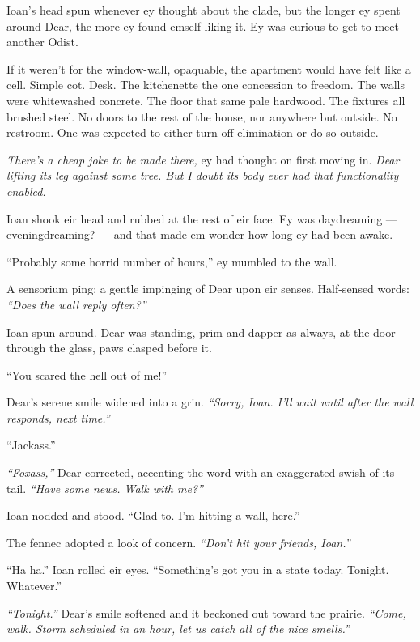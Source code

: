 Ioan's head spun whenever ey thought about the clade, but the longer ey spent around Dear, the more ey found emself liking it. Ey was curious to get to meet another Odist.

If it weren't for the window-wall, opaquable, the apartment would have felt like a cell. Simple cot. Desk. The kitchenette the one concession to freedom. The walls were whitewashed concrete. The floor that same pale hardwood. The fixtures all brushed steel. No doors to the rest of the house, nor anywhere but outside. No restroom. One was expected to either turn off elimination or do so outside.

\emph{There's a cheap joke to be made there,} ey had thought on first moving in. \emph{Dear lifting its leg against some tree. But I doubt its body ever had that functionality enabled.}

Ioan shook eir head and rubbed at the rest of eir face. Ey was daydreaming — eveningdreaming? — and that made em wonder how long ey had been awake.

``Probably some horrid number of hours,'' ey mumbled to the wall.

A sensorium ping; a gentle impinging of Dear upon eir senses. Half-sensed words: \emph{``Does the wall reply often?''}

Ioan spun around. Dear was standing, prim and dapper as always, at the door through the glass, paws clasped before it.

``You scared the hell out of me!''

Dear's serene smile widened into a grin. \emph{``Sorry, Ioan. I'll wait until after the wall responds, next time.''}

``Jackass.''

\emph{``Foxass,''} Dear corrected, accenting the word with an exaggerated swish of its tail. \emph{``Have some news. Walk with me?''}

Ioan nodded and stood. ``Glad to. I'm hitting a wall, here.''

The fennec adopted a look of concern. \emph{``Don't hit your friends, Ioan.''}

``Ha ha.'' Ioan rolled eir eyes. ``Something's got you in a state today. Tonight. Whatever.''

\emph{``Tonight.''} Dear's smile softened and it beckoned out toward the prairie. \emph{``Come, walk. Storm scheduled in an hour, let us catch all of the nice smells.''}
